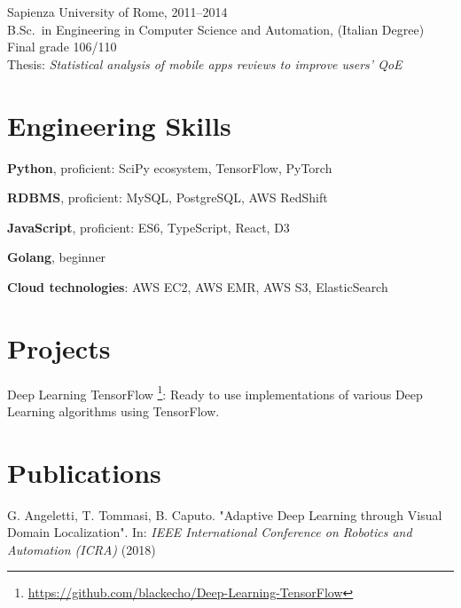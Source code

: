 \documentclass[margin]{res}
\begin{document}
\begin{resume}
            Sapienza University of Rome, \hfill 2011--2014 \\
            B.Sc.\ in Engineering in Computer Science and Automation, (Italian Degree) \\
            Final grade 106/110 \\
            Thesis: \textit{Statistical analysis of mobile apps reviews to improve users' QoE}
        
        \section{Engineering Skills}
        \begin{description}
            \item \textbf{Python}, proficient: SciPy ecosystem, TensorFlow, PyTorch
            \item \textbf{RDBMS}, proficient: MySQL, PostgreSQL, AWS RedShift
            \item \textbf{JavaScript}, proficient: ES6, TypeScript, React, D3
            \item \textbf{Golang}, beginner
            \item \textbf{Cloud technologies}: AWS EC2, AWS EMR, AWS S3, ElasticSearch
        \end{description}

        \section{Projects}
        \begin{description}
            \item Deep Learning TensorFlow \footnote{\url{https://github.com/blackecho/Deep-Learning-TensorFlow}}:
                Ready to use implementations of various Deep Learning algorithms using TensorFlow.
        \end{description}

        \section{Publications}
        \begin{description}
            \item G. Angeletti, T. Tommasi, B. Caputo.
                "Adaptive Deep Learning through Visual Domain Localization".
                In: \textit{IEEE International Conference on Robotics and Automation (ICRA)} (2018)
        \end{description}


\end{resume}
\end{document}
